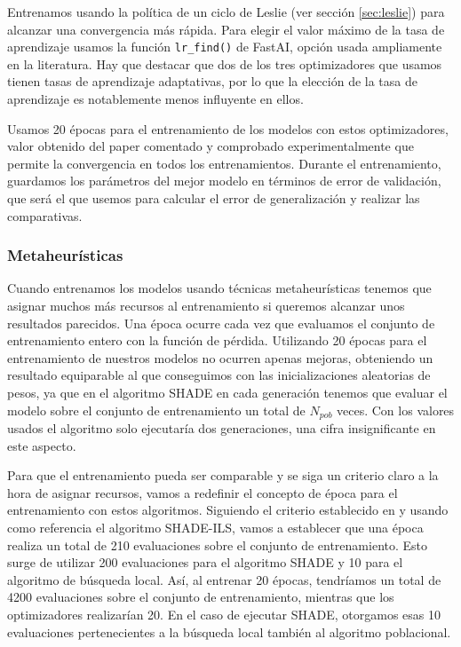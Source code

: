 Entrenamos usando la política de un ciclo de Leslie (ver sección \ref{sec:leslie}) para alcanzar una convergencia más rápida. Para elegir el valor máximo de la tasa de aprendizaje usamos la función \verb|lr_find()| de FastAI, opción usada ampliamente en la literatura. Hay que destacar que dos de los tres optimizadores que usamos tienen tasas de aprendizaje adaptativas, por lo que la elección de la tasa de aprendizaje es notablemente menos influyente en ellos. 

Usamos 20 épocas para el entrenamiento de los modelos con estos optimizadores, valor obtenido del paper comentado y comprobado experimentalmente que permite la convergencia en todos los entrenamientos. Durante el entrenamiento, guardamos los parámetros del mejor modelo en términos de error de validación, que será el que usemos para calcular el error de generalización y realizar las comparativas.





\subsubsection{Metaheurísticas}

Cuando entrenamos los modelos usando técnicas metaheurísticas tenemos que asignar muchos más recursos al entrenamiento si queremos alcanzar unos resultados parecidos. Una época ocurre cada vez que evaluamos el conjunto de entrenamiento entero con la función de pérdida. Utilizando 20 épocas para el entrenamiento de nuestros modelos no ocurren apenas mejoras, obteniendo un resultado equiparable al que conseguimos con las inicializaciones aleatorias de pesos, ya que en el algoritmo SHADE en cada generación tenemos que evaluar el modelo sobre el conjunto de entrenamiento un total de $N_{pob}$ veces. Con los valores usados el algoritmo solo ejecutaría dos generaciones, una cifra insignificante en este aspecto.

Para que el entrenamiento pueda ser comparable y se siga un criterio claro a la hora de asignar recursos, vamos a redefinir el concepto de época para el entrenamiento con estos algoritmos. Siguiendo el criterio establecido en \cite{MHtrainingClase} y usando como referencia el algoritmo SHADE-ILS, vamos a establecer que una época realiza un total de 210 evaluaciones sobre el conjunto de entrenamiento. Esto surge de utilizar 200 evaluaciones para el algoritmo SHADE y 10 para el algoritmo de búsqueda local. Así, al entrenar 20 épocas, tendríamos un total de 4200 evaluaciones sobre el conjunto de entrenamiento, mientras que los optimizadores realizarían 20. En el caso de ejecutar SHADE, otorgamos esas 10 evaluaciones pertenecientes a la búsqueda local también al algoritmo poblacional.


